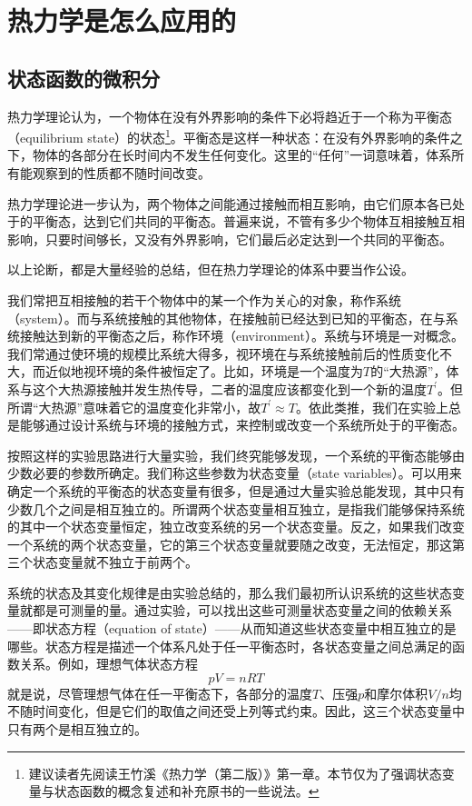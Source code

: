 \documentclass[main.tex]{subfiles}
\begin{document}
\section{热力学是怎么应用的}\label{I.2 pratical_thermodynamics}
\subsection{状态函数的微积分}
热力学理论认为，一个物体在没有外界影响的条件下必将趋近于一个称为平衡态（equilibrium state）的状态\footnote{建议读者先阅读王竹溪《热力学（第二版）》第一章。本节仅为了强调状态变量与状态函数的概念复述和补充原书的一些说法。}。平衡态是这样一种状态：在没有外界影响的条件之下，物体的各部分在长时间内不发生任何变化。这里的“任何”一词意味着，体系所有能观察到的性质都不随时间改变。

热力学理论进一步认为，两个物体之间能通过接触而相互影响，由它们原本各已处于的平衡态，达到它们共同的平衡态。普遍来说，不管有多少个物体互相接触互相影响，只要时间够长，又没有外界影响，它们最后必定达到一个共同的平衡态。

以上论断，都是大量经验的总结，但在热力学理论的体系中要当作公设。

我们常把互相接触的若干个物体中的某一个作为关心的对象，称作系统（system）。而与系统接触的其他物体，在接触前已经达到已知的平衡态，在与系统接触达到新的平衡态之后，称作环境（environment）。系统与环境是一对概念。我们常通过使环境的规模比系统大得多，视环境在与系统接触前后的性质变化不大，而近似地视环境的条件被恒定了。比如，环境是一个温度为$T$的“大热源”，体系与这个大热源接触并发生热传导，二者的温度应该都变化到一个新的温度$T^\prime$。但所谓“大热源”意味着它的温度变化非常小，故$T^\prime\approx T$。依此类推，我们在实验上总是能够通过设计系统与环境的接触方式，来控制或改变一个系统所处于的平衡态。

按照这样的实验思路进行大量实验，我们终究能够发现，一个系统的平衡态能够由少数必要的参数所确定。我们称这些参数为状态变量（state variables）。可以用来确定一个系统的平衡态的状态变量有很多，但是通过大量实验总能发现，其中只有少数几个之间是相互独立的。所谓两个状态变量相互独立，是指我们能够保持系统的其中一个状态变量恒定，独立改变系统的另一个状态变量。反之，如果我们改变一个系统的两个状态变量，它的第三个状态变量就要随之改变，无法恒定，那这第三个状态变量就不独立于前两个。

系统的状态及其变化规律是由实验总结的，那么我们最初所认识系统的这些状态变量就都是可测量的量。通过实验，可以找出这些可测量状态变量之间的依赖关系——即状态方程（equation of state）——从而知道这些状态变量中相互独立的是哪些。状态方程是描述一个体系凡处于任一平衡态时，各状态变量之间总满足的函数关系。例如，理想气体状态方程
\[pV=nRT\]
就是说，尽管理想气体在任一平衡态下，各部分的温度$T$、压强$p$和摩尔体积$V/n$均不随时间变化，但是它们的取值之间还受上列等式约束。因此，这三个状态变量中只有两个是相互独立的。
\end{document}
